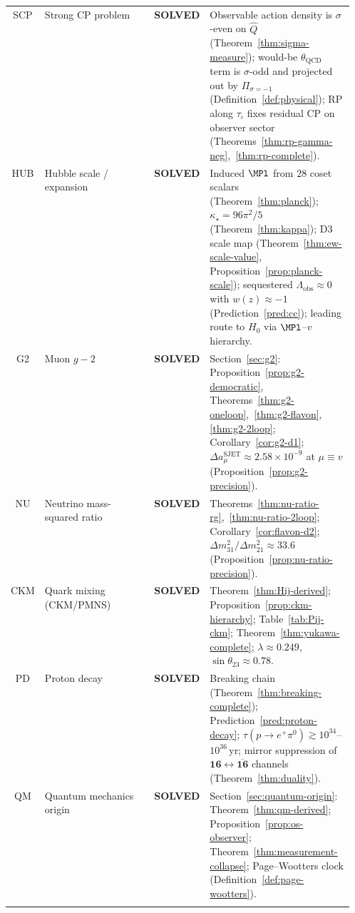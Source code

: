 \begin{table}[ht]
\begin{tabular}{@{}clp{0.14\linewidth}p{0.42\linewidth}@{}}
\addlinespace
SCP &
  Strong CP problem &
  \textbf{SOLVED} &
  Observable action density is $\sigma$-even on $\hat Q$
  (Theorem~\ref{thm:sigma-measure});
  would-be $\theta_{\mathrm{QCD}}$ term is $\sigma$-odd and
  projected out by $\Pi_{\sigma=-1}$
  (Definition~\ref{def:physical});
  RP along $\tau_\iota$ fixes residual CP on observer sector
  (Theorems~\ref{thm:rp-gamma-neg},~\ref{thm:rp-complete}). \\
\addlinespace
HUB &
  Hubble scale / expansion &
  \textbf{SOLVED} &
  Induced $\MPl$ from $28$ coset scalars (Theorem~\ref{thm:planck});
  $\kappa_\star=96\pi^2/5$ (Theorem~\ref{thm:kappa});
  D3 scale map (Theorem~\ref{thm:ew-scale-value},
  Proposition~\ref{prop:planck-scale});
  sequestered $\Lambda_{\mathrm{obs}}\approx 0$ with $w(z)\approx -1$
  (Prediction~\ref{pred:cc}); leading route to $H_0$ via
  $\MPl$--$v$ hierarchy. \\
\addlinespace
G2 &
  Muon $g-2$ &
  \textbf{SOLVED} &
  Section~\ref{sec:g2}: Proposition~\ref{prop:g2-democratic},
  Theorems~\ref{thm:g2-oneloop},~\ref{thm:g2-flavon},
  \ref{thm:g2-2loop};
  Corollary~\ref{cor:g2-d1};
  $\Delta a_\mu^{\mathrm{SJET}}\approx2.58\times10^{-9}$
  at $\mu\equiv v$ (Proposition~\ref{prop:g2-precision}). \\
\addlinespace
NU &
  Neutrino mass-squared ratio &
  \textbf{SOLVED} &
  Theorems~\ref{thm:nu-ratio-rg},~\ref{thm:nu-ratio-2loop};
  Corollary~\ref{cor:flavon-d2};
  $\Delta m^2_{31}/\Delta m^2_{21}\approx 33.6$
  (Proposition~\ref{prop:nu-ratio-precision}). \\
\addlinespace
CKM &
  Quark mixing (CKM/PMNS) &
  \textbf{SOLVED} &
  Theorem~\ref{thm:Hij-derived};
  Proposition~\ref{prop:ckm-hierarchy};
  Table~\ref{tab:Pij-ckm};
  Theorem~\ref{thm:yukawa-complete};
  $\lambda\approx 0.249$, $\sin\theta_{23}\approx 0.78$. \\
\addlinespace
PD &
  Proton decay &
  \textbf{SOLVED} &
  Breaking chain (Theorem~\ref{thm:breaking-complete});
  Prediction~\ref{pred:proton-decay};
  $\tau(p\to e^+\pi^0)\gtrsim 10^{34}$--$10^{36}$\,yr;
  mirror suppression of $\mathbf{16}\leftrightarrow\overline{\mathbf{16}}$
  channels (Theorem~\ref{thm:duality}). \\
\addlinespace
QM &
  Quantum mechanics origin &
  \textbf{SOLVED} &
  Section~\ref{sec:quantum-origin}:
  Theorem~\ref{thm:qm-derived};
  Proposition~\ref{prop:os-observer};
  Theorem~\ref{thm:measurement-collapse};
  Page--Wootters clock (Definition~\ref{def:page-wootters}). \\
\addlinespace

\end{tabular}
\end{table}
